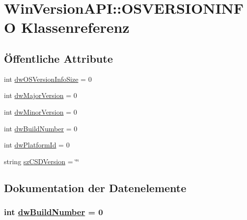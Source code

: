 \hypertarget{classQbeSAS_1_1WinVersionAPI_1_1OSVERSIONINFO}{
\section{Win\-Version\-API::OSVERSIONINFO Klassenreferenz}
\label{classQbeSAS_1_1WinVersionAPI_1_1OSVERSIONINFO}
}
\subsection*{\"{O}ffentliche Attribute}
\begin{CompactItemize}
\item 
int \hyperlink{classQbeSAS_1_1WinVersionAPI_1_1OSVERSIONINFO_QbeSAS_1_1WinVersionAPI_1_1OSVERSIONINFOo0}{dw\-OSVersion\-Info\-Size} = 0
\item 
int \hyperlink{classQbeSAS_1_1WinVersionAPI_1_1OSVERSIONINFO_QbeSAS_1_1WinVersionAPI_1_1OSVERSIONINFOo1}{dw\-Major\-Version} = 0
\item 
int \hyperlink{classQbeSAS_1_1WinVersionAPI_1_1OSVERSIONINFO_QbeSAS_1_1WinVersionAPI_1_1OSVERSIONINFOo2}{dw\-Minor\-Version} = 0
\item 
int \hyperlink{classQbeSAS_1_1WinVersionAPI_1_1OSVERSIONINFO_QbeSAS_1_1WinVersionAPI_1_1OSVERSIONINFOo3}{dw\-Build\-Number} = 0
\item 
int \hyperlink{classQbeSAS_1_1WinVersionAPI_1_1OSVERSIONINFO_QbeSAS_1_1WinVersionAPI_1_1OSVERSIONINFOo4}{dw\-Platform\-Id} = 0
\item 
string \hyperlink{classQbeSAS_1_1WinVersionAPI_1_1OSVERSIONINFO_QbeSAS_1_1WinVersionAPI_1_1OSVERSIONINFOo5}{sz\-CSDVersion} = \char`\"{}\char`\"{}
\end{CompactItemize}


\subsection{Dokumentation der Datenelemente}
\hypertarget{classQbeSAS_1_1WinVersionAPI_1_1OSVERSIONINFO_QbeSAS_1_1WinVersionAPI_1_1OSVERSIONINFOo3}{
\subsubsection[dwBuildNumber]{\setlength{\rightskip}{0pt plus 5cm}int \hyperlink{classQbeSAS_1_1WinVersionAPI_1_1OSVERSIONINFO_QbeSAS_1_1WinVersionAPI_1_1OSVERSIONINFOo3}{dw\-Build\-Number} = 0}}
\label{classQbeSAS_1_1WinVersionAPI_1_1OSVERSIONINFO_QbeSAS_1_1WinVersionAPI_1_1OSVERSIONINFOo3}




